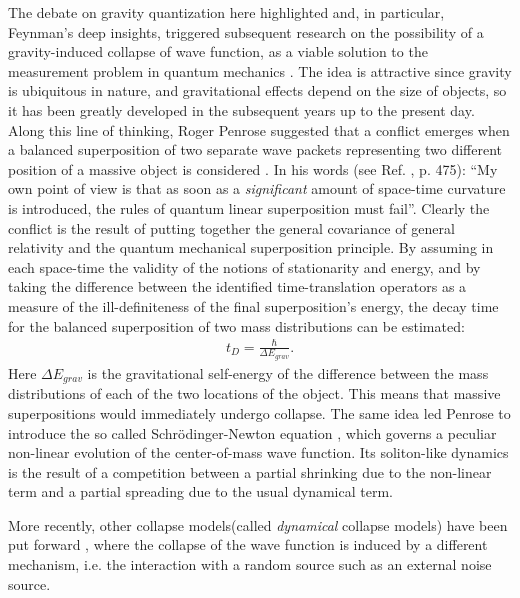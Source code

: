 \documentclass{ws-procs961x669}            %
\begin{document}
The debate on gravity quantization here highlighted and, in
particular, Feynman's deep insights, triggered subsequent research
on the possibility of a gravity-induced collapse of wave function,
as a viable solution to the measurement problem in quantum
mechanics
\cite{karol,frenkel,frenkel1,diosi0,diosi,diosi1,penrose0,penrose1,penrose2,penrose3}.
The idea is attractive since gravity is ubiquitous in nature, and
gravitational effects depend on the size of objects, so it has
been greatly developed in the subsequent years up to the present
day. Along this line of thinking, Roger Penrose suggested that a
conflict emerges when a balanced superposition of two separate
wave packets representing two different position of a massive
object is considered \cite{penrose0,penrose1}. In his words (see
Ref. , p. 475): ``My own point of view is that
as soon as a \textit{significant} amount of space-time curvature
is introduced, the rules of quantum linear superposition must
fail''. Clearly the conflict is the result of putting together the
general covariance of general relativity and the quantum
mechanical superposition principle. By assuming in each space-time
the validity of the notions of stationarity and energy,  and by
taking the difference between the identified time-translation
operators as a measure of the ill-definiteness of the final
superposition's energy, the decay time for the balanced
superposition of two mass distributions can be estimated:
%
\begin{eqnarray}\label{PenroseEnergy}
t_D=\frac{\hbar}{\Delta E_{grav}}.
\end{eqnarray}
%
Here $\Delta E_{grav}$ is the gravitational self-energy of the
difference between the mass distributions of each of the two
locations of the object. This means that massive superpositions
would immediately undergo collapse. The same idea led Penrose to
introduce the so called Schr\"{o}dinger-Newton equation
\cite{penrose2}, which governs a peculiar non-linear evolution of
the center-of-mass wave function. Its soliton-like dynamics is the
result of a competition between a partial shrinking due to the
non-linear term and a partial spreading due to the usual dynamical
term.

More recently, other collapse models(called \textit{dynamical}
collapse models) have been put forward
\cite{random1,random2,random3,random4}, where the collapse of the
wave function is induced by a different mechanism, i.e. the
interaction with a random source such as an external noise source.
\end{document}
